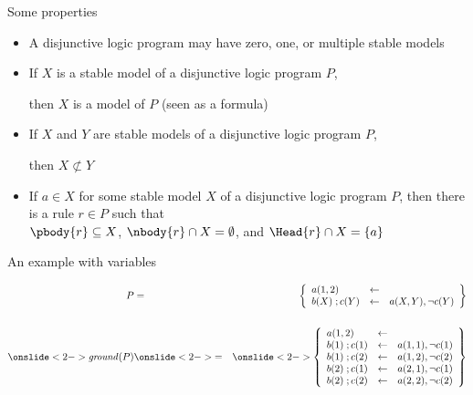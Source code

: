 \begin{frame}{Some properties}
  \bigskip\bigskip
  \begin{itemize}
    \item A disjunctive logic program may have zero, one, or multiple stable models

    \item If $X$ is a  stable model of a disjunctive logic program $P$,

          then $X$ is a model of $P$ (seen as a formula)
    \item If $X$ and $Y$ are stable models of a disjunctive logic program $P$,

          then $X\not\subset Y$
          \bigskip
    \item<2> If $a\in X$ for some stable model $X$ of a disjunctive logic program $P$,
          then there is a rule
          $r\in P$
          such that\\
          $\pbody{r}\subseteq X$, $\nbody{r}\cap X=\emptyset$, and
          $\Head{r}\cap X=\{a\}$
  \end{itemize}
\end{frame}
\begin{frame}{An example with variables}

  \begin{eqnarray*}
    P
    &=&
    \left\{
    \begin{array}{lcl}
      a(1,2)      & \leftarrow &
      \\
      b(X)\;;c(Y) & \leftarrow & a(X,Y), {\neg c(Y)}
    \end{array}
    \right\}
    \\
    &&
    \\
    \onslide<2->{\mathit{ground}(P)}
    &\onslide<2->{=}&
    \onslide<2->{\left\{
      \begin{array}{lcl}
        a(1,2)      & \leftarrow &
        \\
        b(1)\;;c(1) & \leftarrow & a(1,1), {\neg c(1)}
        \\
        b(1)\;;c(2) & \leftarrow & a(1,2), {\neg c(2)}
        \\
        b(2)\;;c(1) & \leftarrow & a(2,1), {\neg c(1)}
        \\
        b(2)\;;c(2) & \leftarrow & a(2,2), {\neg c(2)}
      \end{array}
      \right\}}
  \end{eqnarray*}

\end{frame}

